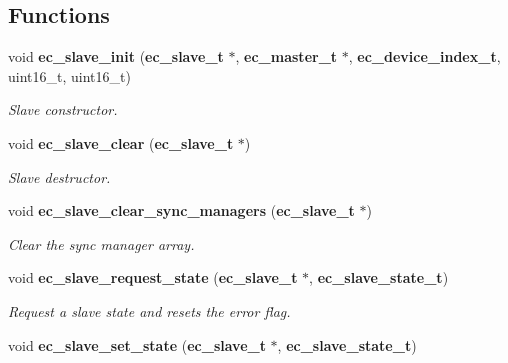 \subsection*{\-Functions}
\begin{DoxyCompactItemize}
\item 
void {\bf ec\-\_\-slave\-\_\-init} ({\bf ec\-\_\-slave\-\_\-t} $\ast$, {\bf ec\-\_\-master\-\_\-t} $\ast$, {\bf ec\-\_\-device\-\_\-index\-\_\-t}, uint16\-\_\-t, uint16\-\_\-t)
\begin{DoxyCompactList}\small\item\em \-Slave constructor. \end{DoxyCompactList}\item 
void {\bf ec\-\_\-slave\-\_\-clear} ({\bf ec\-\_\-slave\-\_\-t} $\ast$)
\begin{DoxyCompactList}\small\item\em \-Slave destructor. \end{DoxyCompactList}\item 
void {\bf ec\-\_\-slave\-\_\-clear\-\_\-sync\-\_\-managers} ({\bf ec\-\_\-slave\-\_\-t} $\ast$)\label{slave_8h_a75ddcc7d265095322850d243007602b2}

\begin{DoxyCompactList}\small\item\em \-Clear the sync manager array. \end{DoxyCompactList}\item 
void {\bf ec\-\_\-slave\-\_\-request\-\_\-state} ({\bf ec\-\_\-slave\-\_\-t} $\ast$, {\bf ec\-\_\-slave\-\_\-state\-\_\-t})\label{slave_8h_a8b3d447dd21d0888959a5a3691597e77}

\begin{DoxyCompactList}\small\item\em \-Request a slave state and resets the error flag. \end{DoxyCompactList}\item 
void {\bf ec\-\_\-slave\-\_\-set\-\_\-state} ({\bf ec\-\_\-slave\-\_\-t} $\ast$, {\bf ec\-\_\-slave\-\_\-state\-\_\-t})\label{slave_8h_aaede3967b1b6c24a513006654b85ca8a}


\end{DoxyCompactItemize}
